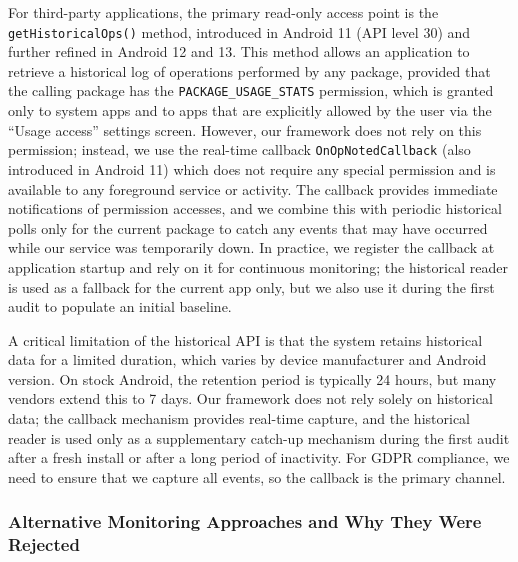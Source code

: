 For third-party applications, the primary read-only access point is the \texttt{getHistoricalOps()} method, introduced in Android 11 (API level 30) and further refined in Android 12 and 13. This method allows an application to retrieve a historical log of operations performed by any package, provided that the calling package has the \texttt{PACKAGE\_USAGE\_STATS} permission, which is granted only to system apps and to apps that are explicitly allowed by the user via the ``Usage access'' settings screen. However, our framework does not rely on this permission; instead, we use the real-time callback \texttt{OnOpNotedCallback} (also introduced in Android 11) which does not require any special permission and is available to any foreground service or activity. The callback provides immediate notifications of permission accesses, and we combine this with periodic historical polls only for the current package to catch any events that may have occurred while our service was temporarily down. In practice, we register the callback at application startup and rely on it for continuous monitoring; the historical reader is used as a fallback for the current app only, but we also use it during the first audit to populate an initial baseline.

A critical limitation of the historical API is that the system retains historical data for a limited duration, which varies by device manufacturer and Android version. On stock Android, the retention period is typically 24 hours, but many vendors extend this to 7 days. Our framework does not rely solely on historical data; the callback mechanism provides real-time capture, and the historical reader is used only as a supplementary catch-up mechanism during the first audit after a fresh install or after a long period of inactivity. For GDPR compliance, we need to ensure that we capture all events, so the callback is the primary channel.

\subsubsection{Alternative Monitoring Approaches and Why They Were Rejected}


